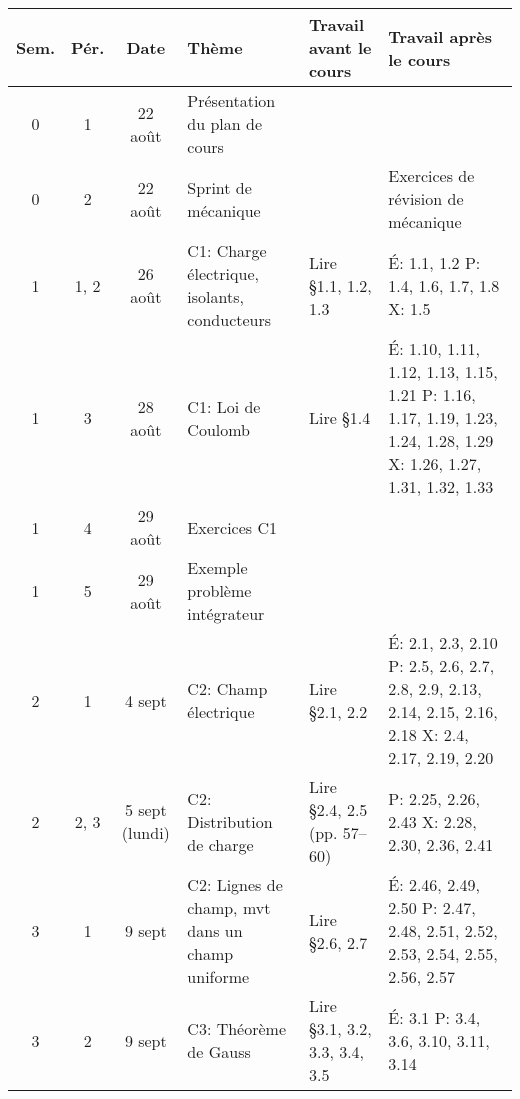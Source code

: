 \documentclass[10pt]{article}
\begin{document}
\sffamily
\renewcommand{\arraystretch}{1.2}
\begin{longtable}{cccp{6cm}lp{9cm}}
  \toprule
  \textbf{Sem.}  &  \textbf{Pér.}  &  \textbf{Date}  &  \textbf{Thème}
    &  \textbf{Travail avant le cours}
    &  \textbf{Travail après le cours}  \\
  \midrule
  \endhead
  0     &  1     &  22 août  &  Présentation du plan de cours
    &  &  \\
  0     &  2     &  22 août  &  Sprint de mécanique
    &  &  Exercices de révision de mécanique  \\
  \midrule
  1     &  1, 2  &  26 août     &  C1: Charge électrique, isolants, conducteurs
    & Lire \S 1.1, 1.2, 1.3
    & É: 1.1, 1.2 \newline 
      P: 1.4, 1.6, 1.7, 1.8 \newline 
      X: 1.5  \\
  1     &  3     &  28 août     &  C1: Loi de Coulomb
    & Lire \S 1.4
    & É: 1.10, 1.11, 1.12, 1.13, 1.15, 1.21 \newline
      P: 1.16, 1.17, 1.19, 1.23, 1.24, 1.28, 1.29 \newline 
      X: 1.26, 1.27, 1.31, 1.32, 1.33 \\
  1     &  4     &  29 août  &  Exercices C1
    &   &    \\
  1     &  5     &  29 août   &  Exemple problème intégrateur
    &   &    \\
  \midrule
  2     &  1     &  4 sept          &  C2: Champ électrique
    &  Lire \S 2.1, 2.2
    &  É: 2.1, 2.3, 2.10 \newline 
       P: 2.5, 2.6, 2.7, 2.8, 2.9, 2.13, 2.14, 2.15, 2.16, 2.18  \newline
       X: 2.4, 2.17, 2.19, 2.20 \\
  2     &  2, 3     &  5 sept (lundi)  &  C2: Distribution de charge
    &  Lire \S 2.4, 2.5 (pp. 57--60)
    &  P: 2.25, 2.26, 2.43 \newline
       X: 2.28, 2.30, 2.36, 2.41 \\
  \midrule
  3     &  1  &  9 sept    &  C2: Lignes de champ, mvt dans un champ uniforme
    & Lire \S 2.6, 2.7
    &  É: 2.46, 2.49, 2.50 \newline 
       P: 2.47, 2.48, 2.51, 2.52, 2.53, 2.54, 2.55, 2.56, 2.57 \\
  3     &  2  &  9 sept    &  C3: Théorème de Gauss
    & Lire \S 3.1, 3.2, 3.3, 3.4, 3.5 
    &  É: 3.1 \newline 
       P: 3.4, 3.6, 3.10, 3.11, 3.14 \newline

\end{longtable}
\end{document}
